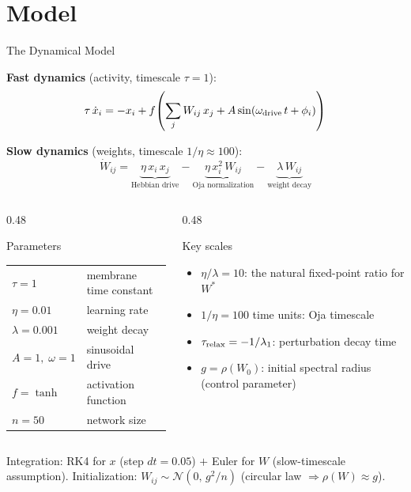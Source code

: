 \documentclass[11pt,aspectratio=169]{beamer}
\begin{document}
\section{Model}

\begin{frame}{The Dynamical Model}

\textbf{Fast dynamics} (activity, timescale $\tau = 1$):
\[
\tau\,\dot{x}_i
  = -x_i
  + f\!\left(\sum_j W_{ij}\,x_j + A\sin(\omega_{\rm drive}\,t + \phi_i)\right)
\]

\textbf{Slow dynamics} (weights, timescale $1/\eta \approx 100$):
\[
\dot{W}_{ij}
  = \underbrace{\eta\,x_i\,x_j}_{\text{Hebbian drive}}
  - \underbrace{\eta\,x_i^2\,W_{ij}}_{\text{Oja normalization}}
  - \underbrace{\lambda\,W_{ij}}_{\text{weight decay}}
\]

\begin{columns}[T]
\begin{column}{0.48\textwidth}
\begin{block}{Parameters}
\begin{tabular}{ll}
$\tau = 1$ & membrane time constant \\
$\eta = 0.01$ & learning rate \\
$\lambda = 0.001$ & weight decay \\
$A = 1,\; \omega = 1$ & sinusoidal drive \\
$f = \tanh$ & activation function \\
$n = 50$ & network size \\
\end{tabular}
\end{block}
\end{column}
\begin{column}{0.48\textwidth}
\begin{block}{Key scales}
\begin{itemize}
  \item $\eta/\lambda = 10$: the natural fixed-point ratio for $W^*$
  \item $1/\eta = 100$ time units: Oja timescale
  \item $\tau_{\rm relax} = -1/\lambda_1$: perturbation decay time
  \item $g = \rho(W_0)$: initial spectral radius (control parameter)
\end{itemize}
\end{block}
\end{column}
\end{columns}

\vspace{0.3em}
\footnotesize
Integration: RK4 for $x$ (step $dt=0.05$) $+$ Euler for $W$ (slow-timescale assumption).
Initialization: $W_{ij} \sim \mathcal{N}(0,\,g^2/n)$ (circular law $\Rightarrow \rho(W)\approx g$).
\end{frame}
\end{document}
